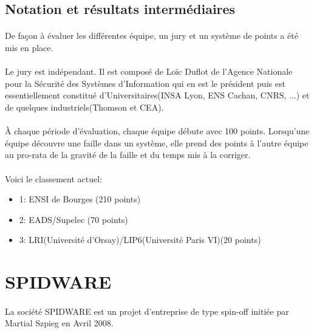    		\subsection{Notation et résultats intermédiaires}
   			\paragraph*{}
   				De façon à évaluer les différentes équipe, un jury et un système de points a été mis en place.
   			
   			\paragraph*{}
   				Le jury est indépendant. Il est composé de Loïc Duflot de l'Agence Nationale pour la Sécurité des Systèmes d'Information qui en est le président puis est essentiellement constitué d'Universitaires(INSA Lyon, ENS Cachan, CNRS, ...) et de quelques industriels(Thomson et CEA).
   			
   			\paragraph*{}
   				À chaque période d'évaluation, chaque équipe débute avec 100 points. Lorsqu'une équipe découvre une faille dans un système, elle prend des points à l'autre équipe au pro-rata de la gravité de la faille et du temps mis à la corriger.
   				
   			\paragraph*{}
   				Voici le classement actuel:
   				\begin{itemize}
   					\item 1: ENSI de Bourges (210 points)
   					\item 2: EADS/Supelec (70 points)
   					\item 3: LRI(Université d'Orsay)/LIP6(Université Paris VI)(20 points)
   				\end{itemize}	
	
	\newpage
	\section{SPIDWARE}
		\paragraph*{}
			La société SPIDWARE est un projet d'entreprise de type spin-off initiée par Martial Szpieg en Avril 2008.
		
